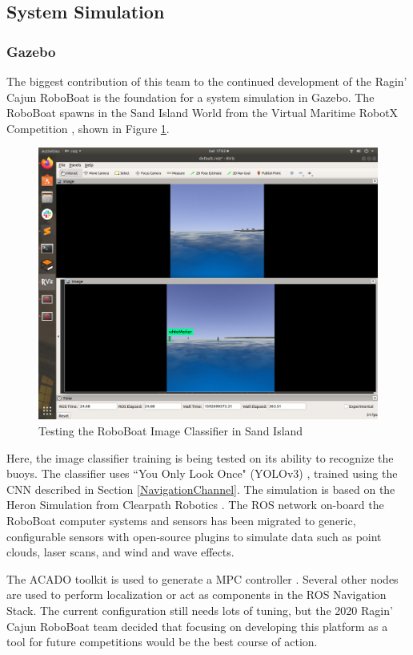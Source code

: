 \documentclass[letterpaper, 12 pt, conference]{ieeeconf}
\begin{document}
\subsection{System Simulation}
\subsubsection{Gazebo}
The biggest contribution of this team to the continued development of the Ragin' Cajun RoboBoat is the foundation for a system simulation in Gazebo. The RoboBoat spawns in the Sand Island World from the Virtual Maritime RobotX Competition \cite{Bingham:19a}, shown in Figure \ref{fig:YOLO}.
%
\begin{figure}[tb]
\centering
\vspace{0.05in}
\includegraphics[width=\columnwidth]{Figures/YOLOV3.png}
\caption{Testing the RoboBoat Image Classifier in Sand Island}
\label{fig:YOLO}
\end{figure}
%
Here, the image classifier training is being tested on its ability to recognize the buoys. The classifier uses ``You Only Look Once" (YOLOv3) \cite{Redmon:18a}, trained using the CNN described in Section \ref{NavigationChannel}. The simulation is based on the Heron Simulation from Clearpath Robotics \cite{Bogdon:19a}. The ROS network on-board the RoboBoat computer systems and sensors has been migrated to generic, configurable sensors with open-source plugins to simulate data such as point clouds, laser scans, and wind and wave effects. 

The ACADO toolkit is used to generate a MPC controller \cite{Houska:11a}. Several other nodes are used to perform localization or act as components in the ROS Navigation Stack. The current configuration still needs lots of tuning, but the 2020 Ragin' Cajun RoboBoat team decided that focusing on developing this platform as a tool for future competitions would be the best course of action.
\end{document}
